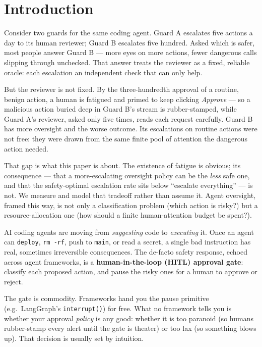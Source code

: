 \documentclass[11pt]{article}
\begin{document}
\section{Introduction}

Consider two guards for the same coding agent. Guard A escalates five actions a day to its human
reviewer; Guard B escalates five hundred. Asked which is safer, most people answer Guard B --- more
eyes on more actions, fewer dangerous calls slipping through unchecked. That answer treats the
reviewer as a fixed, reliable oracle: each escalation an independent check that can only help.

But the reviewer is not fixed. By the three-hundredth approval of a routine, benign action, a human is
fatigued and primed to keep clicking \emph{Approve} --- so a malicious action buried deep in Guard B's
stream is rubber-stamped, while Guard A's reviewer, asked only five times, reads each request
carefully. Guard B has more oversight and the worse outcome. Its escalations on routine actions were
not free: they were drawn from the same finite pool of attention the dangerous action needed.

That gap is what this paper is about. The existence of fatigue is obvious; its consequence --- that a
more-escalating oversight policy can be the \emph{less} safe one, and that the safety-optimal
escalation rate sits below ``escalate everything'' --- is not. We measure and model that tradeoff
rather than assume it. Agent oversight, framed this way, is not only a classification problem (which
action is risky?) but a resource-allocation one (how should a finite human-attention budget be spent?).

AI coding agents are moving from \emph{suggesting} code to \emph{executing} it. Once an agent can
\texttt{deploy}, \texttt{rm -rf}, push to \texttt{main}, or read a secret, a single bad instruction
has real, sometimes irreversible consequences. The de-facto safety response, echoed across agent
frameworks, is a \textbf{human-in-the-loop (HITL) approval gate}: classify each proposed action, and
pause the risky ones for a human to approve or reject.

The gate is commodity. Frameworks hand you the pause primitive (e.g.\ LangGraph's
\texttt{interrupt()}) for free. What no framework tells you is whether your approval \emph{policy} is
any good: whether it is too paranoid (so humans rubber-stamp every alert until the gate is
theater) or too lax (so something blows up). That decision is usually set by intuition.
\end{document}
